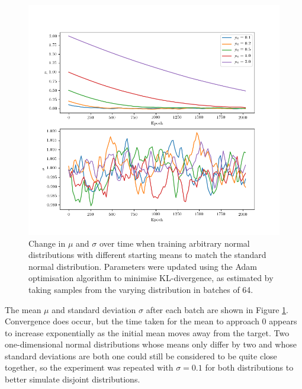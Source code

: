 \documentclass[../../main.tex]{subfiles}
\begin{document}
\begin{figure}
    \begin{center}
    \includegraphics[width=\textwidth]{broadKLDivergence}
    \caption{
        Change in $\mu$ and $\sigma$ over time when training arbitrary normal distributions with different starting means to match the standard normal distribution. 
        Parameters were updated using the Adam optimisation algorithm to minimise KL-divergence, as estimated by taking samples from the varying distribution in batches of 64.
    }
    \label{fig:broadKLDivergence}
    \end{center}
\end{figure}

The mean $\mu$ and standard deviation $\sigma$ after each batch are shown in Figure \ref{fig:broadKLDivergence}.
Convergence does occur, but the time taken for the mean to approach $0$ appears to increase exponentially as the initial mean moves away from the target.
Two one-dimensional normal distributions whose means only differ by two and whose standard deviations are both one could still be considered to be quite close together, so the experiment was repeated with $\sigma=0.1$ for both distributions to better simulate disjoint distributions.
\end{document}
